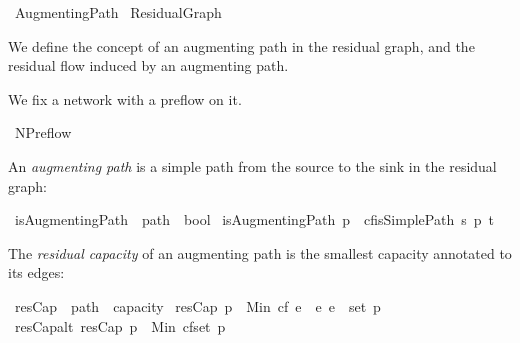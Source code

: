 %
\begin{isabellebody}%
%
%
\isamarkuptrue%
%
\isadelimtheory
%
\endisadelimtheory
%
\isatagtheory
{}\isamarkupfalse%
\ Augmenting{\isacharunderscore}Path\isanewline
{}\ Residual{\isacharunderscore}Graph\isanewline
{}%
\endisatagtheory
{\isafoldtheory}%
%
\isadelimtheory
%
\endisadelimtheory
%
\begin{isamarkuptext}%
We define the concept of an augmenting path in the residual graph,
  and the residual flow induced by an augmenting path.%
\end{isamarkuptext}\isamarkuptrue%
%
\begin{isamarkuptext}%
We fix a network with a preflow  on it.%
\end{isamarkuptext}\isamarkuptrue%
\isamarkupfalse%
\ NPreflow\isanewline
{}%
\isamarkuptrue%
%
\begin{isamarkuptext}%
An \emph{augmenting path} is a simple path from the source to the sink in the residual graph:%
\end{isamarkuptext}\isamarkuptrue%
\isamarkupfalse%
\ isAugmentingPath\ {\isacharcolon}{\isacharcolon}\ {\isachardoublequoteopen}path\ {\isasymRightarrow}\ bool{\isachardoublequoteclose}\isanewline
{}\ {\isachardoublequoteopen}isAugmentingPath\ p\ {\isasymequiv}\ cf{\isachardot}isSimplePath\ s\ p\ t{\isachardoublequoteclose}%
\begin{isamarkuptext}%
The \emph{residual capacity} of an augmenting path is the smallest capacity 
  annotated to its edges:%
\end{isamarkuptext}\isamarkuptrue%
\isamarkupfalse%
\ resCap\ {\isacharcolon}{\isacharcolon}\ {\isachardoublequoteopen}path\ {\isasymRightarrow}\ {\isacharprime}capacity{\isachardoublequoteclose}\isanewline
{}\ {\isachardoublequoteopen}resCap\ p\ {\isasymequiv}\ Min\ {\isacharbraceleft}cf\ e\ {\isacharbar}\ e{\isachardot}\ e\ {\isasymin}\ set\ p{\isacharbraceright}{\isachardoublequoteclose}\isanewline
\isanewline
{}\isamarkupfalse%
\ resCap{\isacharunderscore}alt{\isacharcolon}\ {\isachardoublequoteopen}resCap\ p\ {\isacharequal}\ Min\ {\isacharparenleft}cf{\isacharbackquote}set\ p{\isacharparenright}{\isachardoublequoteclose}\ \ \isanewline
\ \ %
\end{isabellebody}
